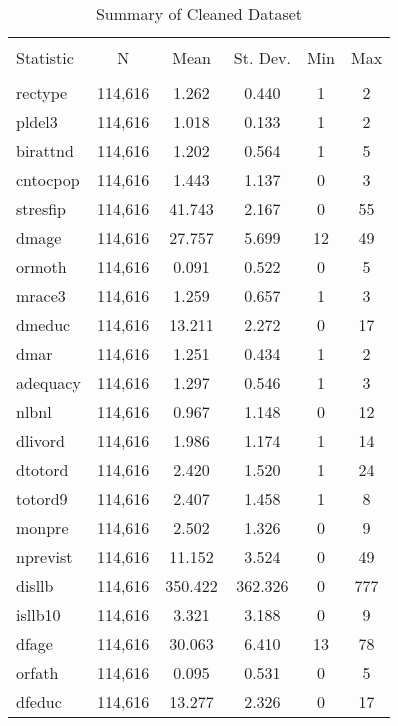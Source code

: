 \documentclass[a4paper, 12pt]{article}
\begin{document}
\begin{table}[!htbp] \centering 
  \caption{Summary of Cleaned Dataset} 
  \label{} 
\begin{tabular}{@{\extracolsep{5pt}}lccccc} 
\\[-1.8ex]\hline 
\hline \\[-1.8ex] 
Statistic & \multicolumn{1}{c}{N} & \multicolumn{1}{c}{Mean} & \multicolumn{1}{c}{St. Dev.} & \multicolumn{1}{c}{Min} & \multicolumn{1}{c}{Max} \\ 
\hline \\[-1.8ex] 
rectype & 114,616 & 1.262 & 0.440 & 1 & 2 \\ 
pldel3 & 114,616 & 1.018 & 0.133 & 1 & 2 \\ 
birattnd & 114,616 & 1.202 & 0.564 & 1 & 5 \\ 
cntocpop & 114,616 & 1.443 & 1.137 & 0 & 3 \\ 
stresfip & 114,616 & 41.743 & 2.167 & 0 & 55 \\ 
dmage & 114,616 & 27.757 & 5.699 & 12 & 49 \\ 
ormoth & 114,616 & 0.091 & 0.522 & 0 & 5 \\ 
mrace3 & 114,616 & 1.259 & 0.657 & 1 & 3 \\ 
dmeduc & 114,616 & 13.211 & 2.272 & 0 & 17 \\ 
dmar & 114,616 & 1.251 & 0.434 & 1 & 2 \\ 
adequacy & 114,616 & 1.297 & 0.546 & 1 & 3 \\ 
nlbnl & 114,616 & 0.967 & 1.148 & 0 & 12 \\ 
dlivord & 114,616 & 1.986 & 1.174 & 1 & 14 \\ 
dtotord & 114,616 & 2.420 & 1.520 & 1 & 24 \\ 
totord9 & 114,616 & 2.407 & 1.458 & 1 & 8 \\ 
monpre & 114,616 & 2.502 & 1.326 & 0 & 9 \\ 
nprevist & 114,616 & 11.152 & 3.524 & 0 & 49 \\ 
disllb & 114,616 & 350.422 & 362.326 & 0 & 777 \\ 
isllb10 & 114,616 & 3.321 & 3.188 & 0 & 9 \\ 
dfage & 114,616 & 30.063 & 6.410 & 13 & 78 \\ 
orfath & 114,616 & 0.095 & 0.531 & 0 & 5 \\ 
dfeduc & 114,616 & 13.277 & 2.326 & 0 & 17 \\ 

\end{tabular}
\end{table}
\end{document}
